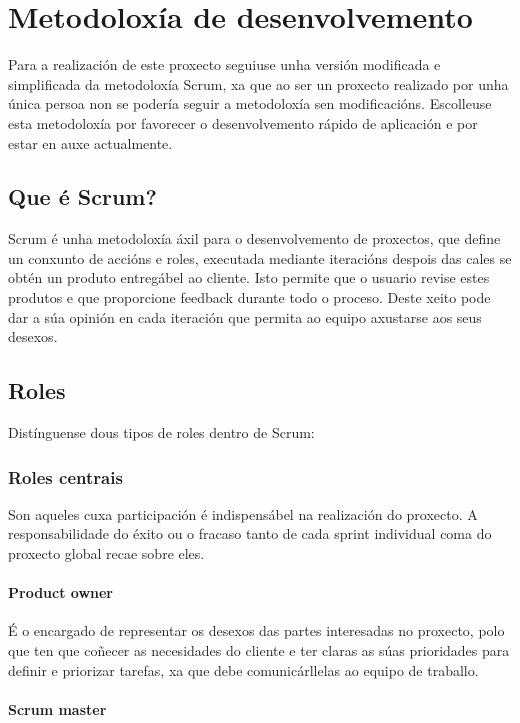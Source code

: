 \chapter{Metodoloxía de desenvolvemento}

Para a realización de este proxecto seguiuse unha versión modificada e simplificada da metodoloxía Scrum, xa que ao ser un proxecto realizado por unha única persoa non se podería seguir a metodoloxía sen modificacións. Escolleuse esta metodoloxía por favorecer o desenvolvemento rápido de aplicación e por estar en auxe actualmente.

\section{Que é Scrum?}

Scrum é unha metodoloxía áxil para o desenvolvemento de proxectos, que define un conxunto de accións e roles, executada mediante iteracións despois das cales se obtén un produto entregábel ao cliente. Isto permite que o usuario revise estes produtos e que proporcione feedback durante todo o proceso. Deste xeito pode dar a súa opinión en cada iteración que permita ao equipo axustarse aos seus desexos.

\section{Roles}

Distínguense dous tipos de roles dentro de Scrum:

\subsection{Roles centrais}

Son aqueles cuxa participación é indispensábel na realización do proxecto. A responsabilidade do éxito ou o fracaso tanto de cada sprint individual coma do proxecto global recae sobre eles.

\subsubsection{Product owner}

É o encargado de representar os desexos das partes interesadas no proxecto, polo que ten que coñecer as necesidades do cliente e ter claras as súas prioridades para definir e priorizar tarefas, xa que debe comunicárllelas ao equipo de traballo.

\subsubsection{Scrum master}

